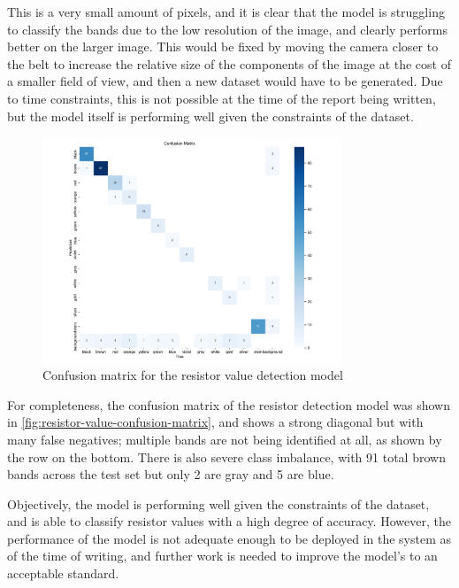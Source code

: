 This is a very small amount of pixels, and it is clear that the model is struggling to classify the bands due to the low resolution of the image, and clearly performs better on the larger image. This would be fixed by moving the camera closer to the belt to increase the relative size of the components of the image at the cost of a smaller field of view, and then a new dataset would have to be generated. Due to time constraints, this is not possible at the time of the report being written, but the model itself is performing well given the constraints of the dataset.

\begin{figure}[H]
  \centering
  \includegraphics[width=0.8\textwidth]{imgs/graphs/confusion_matrix_bands.png}
  \caption{Confusion matrix for the resistor value detection model}
  \label{fig:resistor-value-confusion-matrix}
\end{figure}

For completeness, the confusion matrix of the resistor detection model was shown in \autoref{fig:resistor-value-confusion-matrix}, and shows a strong diagonal but with many false negatives; multiple bands are not being identified at all, as shown by the row on the bottom. There is also severe class imbalance, with 91 total brown bands across the test set but only 2 are gray and 5 are blue.

Objectively, the model is performing well given the constraints of the dataset, and is able to classify resistor values with a high degree of accuracy. However, the performance of the model is not adequate enough to be deployed in the system as of the time of writing, and further work is needed to improve the model's to an acceptable standard.

